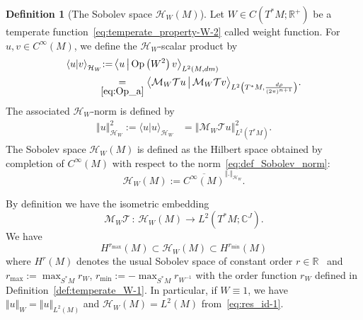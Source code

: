 \documentclass[10pt]{amsart}
\theoremstyle{definition}\newtheorem{defi}[theo]{Definition}\newtheorem{rema}[theo]{Remark}\newtheorem{exam}[theo]{Example}\newtheorem{exem}[theo]{Example}\newtheorem{nota}[theo]{Notation}
\newcommand{\clT}{\mathcal{T}}
\newcommand{\clH}{\mathcal{H}}
\newcommand{\clM}{\mathcal{M}}
\newcommand{\Opp}{\mathrm{Op}}
\newcommand{\bbR}{\mathbb{R}}
\newcommand{\bbC}{\mathbb{C}}
\begin{document}
\begin{cBoxA}{}
\begin{defi}[The Sobolev space $\clH _{W}(M)$]\label{def:Anisotropic_Sob_space}
Let $W\in C(T^{*}M;\bbR^{+})$ be a temperate function~\eqref{eq:temperate_property-W-2} called weight function. For $u,v\in C^{\infty}(M)$, we define the $\clH _{W}$-scalar product by
\begin{equation}\label{eq:def_H_W_M}
\begin{split}
\left\langle u|v\right\rangle _{\clH _{W}}
&{:=}\left\langle u\,\middle|\,\Opp \left(W^{2}\right)v\right\rangle _{L^{2}\left(M,dm\right)}\\
&\mkern-8mu\underset{\eqref{eq:Op_a}}{=}\big\langle\clM_{W}\clT u\,\big|\,\clM_{W}\clT v\big\rangle_{L^{2}\left(T^{*}M,\frac{d\rho}{\left(2\pi\right)^{n+1}}\right)}.
\end{split}
\end{equation}
The associated $\clH _{W}$-norm is defined by
\begin{align}\label{eq:def_Sobolev_norm}
\left\Vert u\right\Vert _{\clH _{W}}^{2}:=\langle u|u\rangle_{\clH _{W}} & =\left\Vert \clM_{W}\clT u\right\Vert _{L^{2}\left(T^{*}M\right)}^{2}.
\end{align}
The Sobolev space $\clH _{W}(M)$ is defined as the Hilbert space obtained by completion of $C^{\infty}(M)$ with respect to the norm~\eqref{eq:def_Sobolev_norm}:
\begin{equation}\label{eq:def_H_W}
\clH _{W}\left(M\right):=\overline{C^{\infty}\left(M\right)}^{\left\Vert.\right\Vert _{\clH _{W}}}.
\end{equation}
\end{defi}
\end{cBoxA}

By definition we have the isometric embedding
\begin{equation}\label{eq:isometry}
\clM_{W}\clT\,:\,\clH _{W}\left(M\right)\rightarrow L^{2}\left(T^{*}M;\bbC^{J}\right).
\end{equation}
We have
\[
H^{r_{\max}}\left(M\right)\subset\clH _{W}\left(M\right)\subset H^{r_{\min}}\left(M\right)
\]
where $H^{r}(M)$ denotes the usual Sobolev space of constant order $r\in\bbR$~\cite[Chap.3]{taylor_tome1} and $r_{\max}:=\max_{S^{*}M}r_{W}$, $r_{\min}:=-\max_{S^{*}M}r_{W^{-1}}$ with the order function $r_{W}$ defined in Definition~\ref{def:temperate_W-1}. In particular, if $W\equiv1$, we have $\Vert u\Vert _{W}=\Vert u\Vert _{L^{2}(M)}$ and $\clH _{W}(M)=L^{2}(M)$ from~\eqref{eq:res_id-1}.
\end{document}
